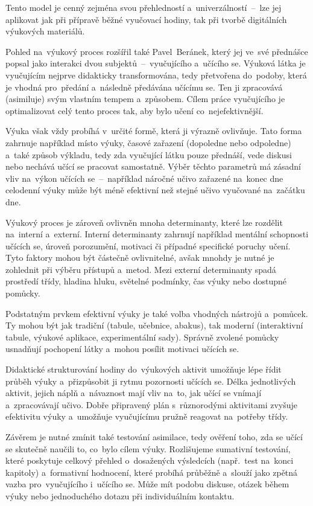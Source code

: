 \documentclass[male,czech,api_bc]{kitheses}
\begin{document}
Tento model je cenný zejména svou přehledností a~univerzálností~--~lze jej aplikovat jak při přípravě běžné vyučovací hodiny, tak při tvorbě digitálních výukových materiálů.

Pohled na~výukový proces rozšířil také Pavel~Beránek, který jej ve~své přednášce popsal jako interakci dvou subjektů~--~vyučujícího a~učícího se. Výuková látka je vyučujícím nejprve didakticky transformována, tedy přetvořena do~podoby, která je vhodná pro~předání a~následně předávána učícímu se. Ten ji zpracovává (asimiluje) svým vlastním tempem a~způsobem. Cílem práce vyučujícího je optimalizovat celý tento proces tak, aby bylo učení co~nejefektivnější.

Výuka však vždy probíhá v~určité formě, která ji výrazně ovlivňuje. Tato forma zahrnuje například místo výuky, časové zařazení (dopoledne nebo odpoledne) a~také způsob výkladu, tedy zda vyučující látku pouze přednáší, vede diskusi nebo nechává učící se pracovat samostatně. Výběr těchto parametrů má zásadní vliv na~výkon učících se~--~například náročné učivo zařazené na~konec dne celodenní výuky může být méně efektivní než stejné učivo vyučované na~začátku dne.

Výukový proces je zároveň ovlivněn mnoha determinanty, které lze rozdělit na~interní a~externí. Interní determinanty zahrnují například mentální schopnosti učících se, úroveň porozumění, motivaci či případné specifické poruchy učení. Tyto faktory mohou být částečně ovlivnitelné, avšak mnohdy je nutné je zohlednit při výběru přístupů a~metod. Mezi externí determinanty spadá prostředí třídy, hladina hluku, světelné podmínky, čas výuky nebo dostupné pomůcky.

Podstatným prvkem efektivní výuky je také volba vhodných nástrojů a~pomůcek. Ty mohou být jak tradiční (tabule, učebnice, abakus), tak moderní (interaktivní tabule, výukové aplikace, experimentální sady). Správně zvolené pomůcky usnadňují pochopení látky a~mohou posílit motivaci učících se.

Didaktické strukturování hodiny do~výukových aktivit umožňuje lépe řídit průběh výuky a~přizpůsobit ji rytmu pozornosti učících se. Délka jednotlivých aktivit, jejich náplň a~návaznost mají vliv na~to, jak učící se vnímají a~zpracovávají učivo. Dobře připravený plán s~různorodými aktivitami zvyšuje efektivitu výuky a~umožňuje vyučujícímu pružně reagovat na~potřeby třídy.

Závěrem je nutné zmínit také testování asimilace, tedy ověření toho, zda se učící se skutečně naučili to, co~bylo cílem výuky. Rozlišujeme sumativní testování, které poskytuje celkový přehled o~dosažených výsledcích (např.~test na~konci kapitoly) a~formativní hodnocení, které probíhá průběžně a~slouží jako zpětná vazba pro~vyučujícího i~učícího se. Může mít podobu diskuse, otázek během výuky nebo jednoduchého dotazu při individuálním kontaktu.
\end{document}
